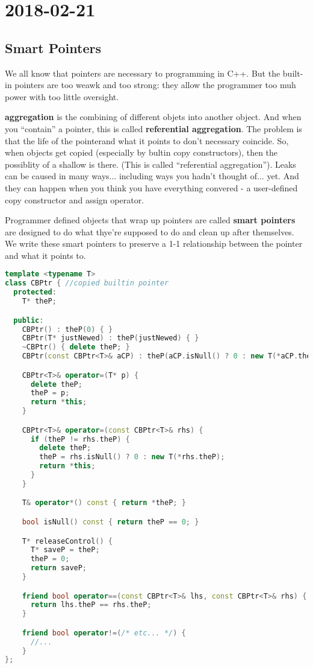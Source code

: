 \section{2018-02-21}

\subsection{Smart Pointers}

We all know that pointers are necessary to programming in C++. But the built-in pointers are too weawk and too strong: they allow the programmer too muh power with too little oversight.

\textbf{aggregation} is the combining of different objets into another object. And when you ``contain'' a pointer, this is called \textbf{referential aggregation}. The problem is that the life of the pointerand what it points to don't necessary coincide. So, when objects get copied (especially by bultin copy constructors), then the possiblity of a shallow is there. (This is called ``referential aggregation''). Leaks can be caused in many ways... including ways you hadn't thought of... yet. And they can happen when you think you have everything convered - a user-defined copy constructor and assign operator.

Programmer defined objects that wrap up pointers are called \textbf{smart pointers} are designed to do what thye're supposed to do and clean up after themselves. We write these smart pointers to preserve a 1-1 relationship between the pointer and what it points to.

\begin{lstlisting}[language=C++]
template <typename T>
class CBPtr { //copied builtin pointer
  protected:
    T* theP;

  public:
    CBPtr() : theP(0) { }
    CBPtr(T* justNewed) : theP(justNewed) { }
    ~CBPtr() { delete theP; }
    CBPtr(const CBPtr<T>& aCP) : theP(aCP.isNull() ? 0 : new T(*aCP.theP)) { }

    CBPtr<T>& operator=(T* p) {
      delete theP;
      theP = p;
      return *this;
    }

    CBPtr<T>& operator=(const CBPtr<T>& rhs) {
      if (theP != rhs.theP) {
        delete theP;
        theP = rhs.isNull() ? 0 : new T(*rhs.theP);
        return *this;
      }
    }

    T& operator*() const { return *theP; }

    bool isNull() const { return theP == 0; }

    T* releaseControl() {
      T* saveP = theP;
      theP = 0;
      return saveP;
    }

    friend bool operator==(const CBPtr<T>& lhs, const CBPtr<T>& rhs) {
      return lhs.theP == rhs.theP;
    }

    friend bool operator!=(/* etc... */) {
      //...
    }
};
\end{lstlisting}


